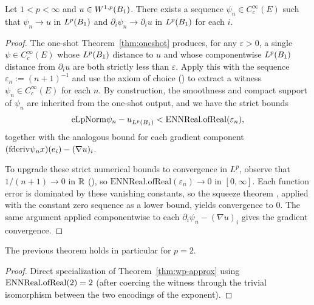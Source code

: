 \begin{theorem}
\label{thm:wp-approx}
\leanok
{}
Let $1 < p < \infty$ and $u \in W^{1,p}(B_{1})$. There exists a sequence
$\psi_n \in C^\infty_c(E)$ such that $\psi_n \to u$ in $L^p(B_{1})$ and
$\partial_i \psi_n \to \partial_i u$ in $L^p(B_{1})$ for each $i$.
\end{theorem}

\begin{proof}
\leanok
{}

The one-shot Theorem~\ref{thm:oneshot} produces, for any $\varepsilon > 0$, a
single $\psi \in C^\infty_c(E)$ whose $L^p(B_{1})$ distance to $u$ and whose
componentwise $L^p(B_{1})$ distance from $\partial_i u$ are both strictly
less than $\varepsilon$. Apply this with the sequence
$\varepsilon_n := (n+1)^{-1}$ and use the axiom of choice
() to extract a witness
$\psi_n \in C^\infty_c(E)$ for each $n$. By construction, the smoothness and
compact support of $\psi_n$ are inherited from the one-shot output, and we
have the strict bounds
\begin{equation*}
  \mathrm{eLpNorm}{\psi_n - u}_{L^p(B_{1})}
    < \mathrm{ENNReal.ofReal}(\varepsilon_n),
\end{equation*}
together with the analogous bound for each gradient component
$(\mathrm{fderiv}{\psi_n}{x})(e_i) - (\nabla u)_i$.

To upgrade these strict numerical bounds to convergence in $L^p$, observe
that $1/(n+1) \to 0$ in $\mathbb{R}$
(), so
$\mathrm{ENNReal.ofReal}(\varepsilon_n) \to 0$ in $[0,\infty]$. Each function
error is dominated by these vanishing constants, so the squeeze theorem
, applied with the
constant zero sequence as a lower bound, yields convergence to $0$. The same
argument applied componentwise to each
$\partial_i \psi_n - (\nabla u)_i$ gives the gradient convergence.
\end{proof}

\begin{theorem}
\label{thm:w12-approx}
\leanok
{}
The previous theorem holds in particular for $p = 2$.
\end{theorem}

\begin{proof}
\leanok
{}

Direct specialization of Theorem~\ref{thm:wp-approx} using $\mathrm{ENNReal.ofReal}(2)
= 2$ (after coercing the witness through the trivial isomorphism between the
two encodings of the exponent).
\end{proof}

